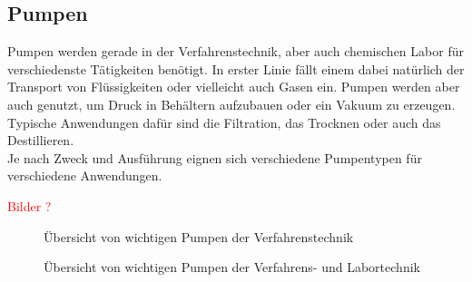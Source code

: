 \newpage

\subsection{Pumpen}
Pumpen werden gerade in der Verfahrenstechnik, aber auch chemischen Labor für verschiedenste Tätigkeiten benötigt. In erster Linie fällt einem dabei natürlich der Transport von Flüssigkeiten oder vielleicht auch Gasen ein. Pumpen werden aber auch genutzt, um Druck in Behältern aufzubauen oder ein Vakuum zu erzeugen. Typische Anwendungen dafür sind die Filtration, das Trocknen oder auch das Destillieren.\\
Je nach Zweck und Ausführung eignen sich verschiedene Pumpentypen für verschiedene Anwendungen.

\textcolor{red}{Bilder ?}


\begin{figure}[h!]
	\centering
	\caption{Übersicht von wichtigen Pumpen der Verfahrenstechnik}
	\label{fig:pumpenvergleich_1}
\end{figure}

\FloatBarrier
\begin{figure}[h!]
	\centering
	\caption{Übersicht von wichtigen Pumpen der Verfahrens- und Labortechnik}
	\label{fig:pumpenvergleich_2}
\end{figure}
\FloatBarrier

